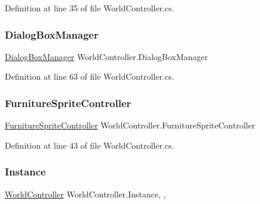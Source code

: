 Definition at line 35 of file World\+Controller.\+cs.

\mbox{\label{class_world_controller_a91a33de942311bdc45fa01def68f2a44}} 
\subsubsection{\texorpdfstring{Dialog\+Box\+Manager}{DialogBoxManager}}
{\footnotesize\ttfamily \hyperlink{class_dialog_box_manager}{Dialog\+Box\+Manager} World\+Controller.\+Dialog\+Box\+Manager\hspace{0.3cm}{\ttfamily [get]}}



Definition at line 63 of file World\+Controller.\+cs.

\mbox{\label{class_world_controller_ab9c8d1512187f0e755ed798a6a98c666}} 
\subsubsection{\texorpdfstring{Furniture\+Sprite\+Controller}{FurnitureSpriteController}}
{\footnotesize\ttfamily \hyperlink{class_furniture_sprite_controller}{Furniture\+Sprite\+Controller} World\+Controller.\+Furniture\+Sprite\+Controller\hspace{0.3cm}{\ttfamily [get]}}



Definition at line 43 of file World\+Controller.\+cs.

\mbox{\label{class_world_controller_a69fb8eed57398b337b0604f49f7dbb2d}} 
\subsubsection{\texorpdfstring{Instance}{Instance}}
{\footnotesize\ttfamily \hyperlink{class_world_controller}{World\+Controller} World\+Controller.\+Instance\hspace{0.3cm}{\ttfamily [static]}, {\ttfamily [get]}, {}}



